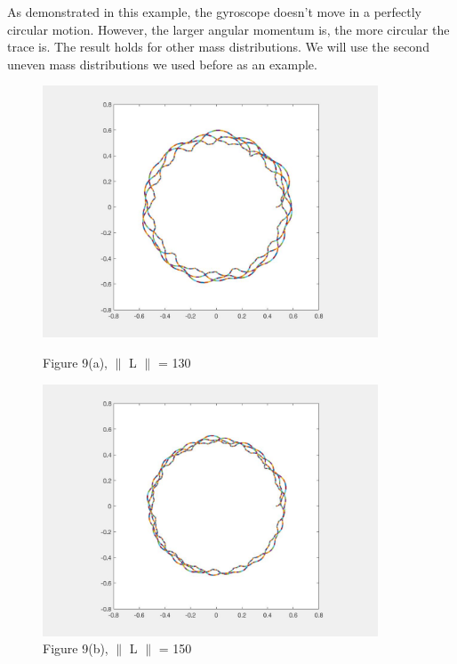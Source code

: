 \documentclass[12pt]{article}
\renewcommand{\(}{\left (}
\renewcommand{\)}{\right )}
\begin{document}
As demonstrated in this example, the gyroscope doesn't move in a perfectly circular motion. However, the larger angular momentum is, the more circular the trace is. The result holds for other mass distributions. We will use the second uneven mass distributions we used before as an example.
\begin{figure}[ht]
	\begin{minipage}{0.33\textwidth}
		\centering
		\includegraphics[width=0.89\textwidth]{uneven_trisection_L130.jpg}
		\caption*{\small Figure 9(a), $\parallel$ L $\parallel$ = 130}
	\end{minipage}
	\begin{minipage}{0.33\textwidth}
		\centering
		\includegraphics[width=0.89\textwidth]{uneven_trisection_L150.jpg}
		\caption*{\small Figure 9(b), $\parallel$ L $\parallel$ = 150}
	\end{minipage}
	\begin{minipage}{0.33\textwidth}

\end{minipage}
\end{figure}
\end{document}

